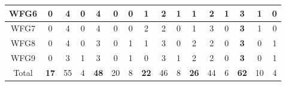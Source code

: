 \begin{table}[h]
{\begin{tabular}{|c|c|c|c|c|c|c|c|c|c|c|c|c|c|c|c|}
WFG6 & 0 & 4 & 0 & 4 & 0 & 0 & 1 & 2 & 1 & 1 & 2 & 1 & \textbf{3} & 1 & 0 \\ \hline
WFG7 & 0 & 4 & 0 & 4 & 0 & 0 & 2 & 2 & 0 & 1 & 3 & 0 & \textbf{3} & 1 & 0 \\ \hline
WFG8 & 0 & 4 & 0 & 3 & 0 & 1 & 1 & 3 & 0 & 2 & 2 & 0 & \textbf{3} & 0 & 1 \\ \hline
WFG9 & 0 & 3 & 1 & 3 & 0 & 1 & 0 & 3 & 1 & 2 & 2 & 0 & \textbf{3} & 0 & 1 \\ \hline
Total & \textbf{17} & 55 & 4 & \textbf{48} & 20 & 8 & \textbf{22} & 46 & 8 & \textbf{26} & 44 & 6 & \textbf{62} & 10 & 4 \\ \hline
\end{tabular}%
}
\end{table}



